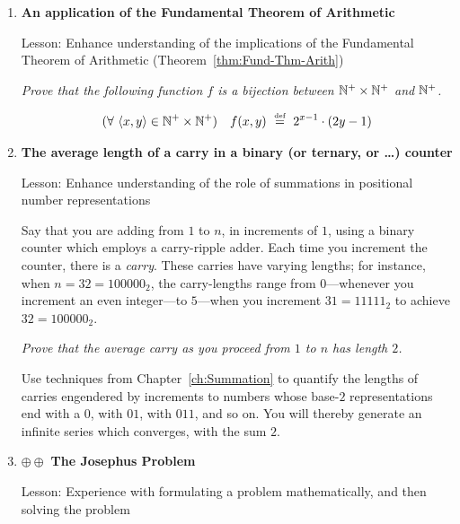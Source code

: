 \begin{enumerate}
\item
{\bf An application of the Fundamental Theorem of Arithmetic}

{\sc Lesson:} Enhance understanding of the implications of the Fundamental Theorem of Arithmetic (Theorem~\ref{thm:Fund-Thm-Arith})

\smallskip

{\em Prove that the following function $f$ is a bijection between $\mathbb{N}^+ \times \mathbb{N}^+$ and $\mathbb{N}^+$.}

\[ (\forall \ \langle x,y \rangle \in \mathbb{N}^+ \times \mathbb{N}^+) 
\ \ \ f(x,y) \ \stackrel{\mbox{{\tiny def}}}{=} \ 2^{x-1} \cdot (2y -1) \]

\medskip\item
{\bf The average length of a carry in a binary (or ternary, or \ldots) counter}

{\sc Lesson:} Enhance understanding of the role of summations in positional number representations

\smallskip

Say that you are adding from $1$ to $n$, in increments of $1$, using a binary counter which employs a carry-ripple adder.  Each time you increment the counter, there is a {\it carry}.  These carries have varying lengths; for instance, when $n = 32 = 100000_2$, the carry-lengths range
from $0$---whenever you increment an even integer---to $5$---when you increment $31 = 11111_2$ to achieve $32 = 100000_2$.

\smallskip

{\em Prove that the average carry as you proceed from $1$ to $n$ has length $2$.}

\medskip

Use techniques from Chapter~\ref{ch:Summation} to quantify the lengths of carries engendered by increments to numbers whose base-$2$ representations end with a $0$,  with $01$, with $011$, and so on.  You will thereby generate an infinite series which converges, with the sum $2$. 

\medskip\item
$\oplus \oplus$
{\bf The Josephus Problem}

 

{\sc Lesson:} Experience with formulating a problem mathematically, and then solving the problem

\smallskip

  


\end{enumerate}
